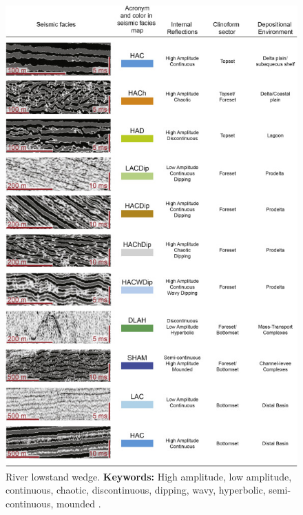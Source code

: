 \begin{figure}[h!]
    \centering
    \includegraphics[width=0.9\linewidth]{Figures/0.3Seismic/Pellegrini2018-1.jpg}
    \caption[River lowstand wedge.]{River lowstand wedge. \textbf{Keywords: }High amplitude, low amplitude, continuous, chaotic, discontinuous, dipping, wavy, hyperbolic, semi-continuous, mounded \citep{Pellegrini2018}.}
    \label{fig:Pellegrini2018-1}
\end{figure}

